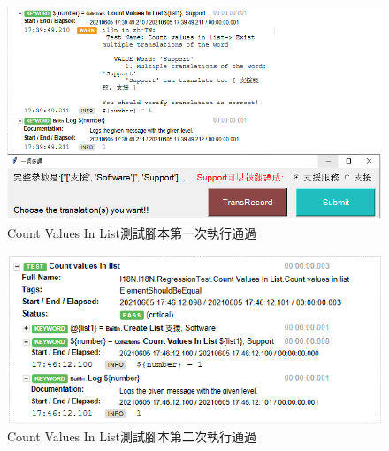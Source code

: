\begin{figure}[H]
\includegraphics[width= \textwidth]{../論文截圖/4.1.2-2 count values in list 1st run.png}
\caption{Count Values In List測試腳本第一次執行通過}
\end{figure}

\begin{figure}[H]
\includegraphics[width= \textwidth]{../論文截圖/4.1.2-3 count values in list 2nd run.png}
\caption{Count Values In List測試腳本第二次執行通過}
\end{figure}

\hspace*{\fill} \\
\\ \hspace*{\fill} \\
\\ \hspace*{\fill} \\
\\ \hspace*{\fill} \\
\\ \hspace*{\fill} \\
